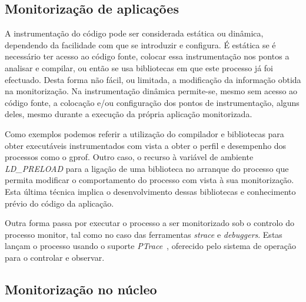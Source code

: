 \documentclass[a4paper]{llncs}
\newcommand{\td}[1]{\todo[inline]{#1}}
\begin{document}
\subsection{Monitorização de aplicações}
\label{sub:user_level_monitor}

A instrumentação do código pode ser considerada estática ou dinâmica, dependendo da facilidade com que se introduzir e configura. É estática se é necessário ter acesso ao código fonte, colocar essa instrumentação nos pontos a analisar e compilar, ou então se usa bibliotecas em que este processo já foi efectuado. Desta forma não fácil, ou limitada, a modificação da informação obtida na monitorização. Na instrumentação dinâmica permite-se, mesmo sem acesso ao código fonte, a colocação e/ou configuração dos pontos de instrumentação, alguns deles, mesmo durante a execução da própria aplicação monitorizada. 


Como exemplos podemos referir a utilização do compilador e bibliotecas para obter executáveis instrumentados com vista a obter o perfil e desempenho dos processos como o gprof\cite{Graham:1982:GCG:800230.806987}.
Outro caso, o recurso à variável de ambiente \textit{LD\_PRELOAD} para a ligação de uma biblioteca no arranque do processo que permita modificar o comportamento do processo com vista à sua monitorização. Esta última técnica implica o desenvolvimento dessas bibliotecas e conhecimento prévio do código da aplicação.

Outra forma passa por executar o processo a ser monitorizado sob o controlo do processo monitor, tal como no caso das ferramentas \textit{strace} e  \textit{debuggers}. Estas lançam o processo usando o suporte \textit{PTrace}~\cite{ptrace}, oferecido pelo sistema de operação para o controlar e observar. 

\subsection{Monitorização no núcleo}
\label{sub_kernel_instrumentation}
\end{document}
